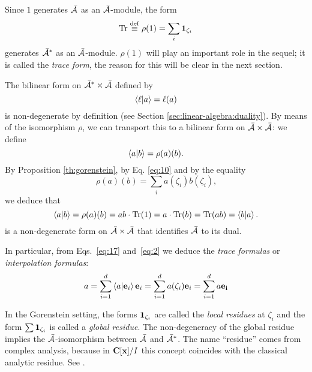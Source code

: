 Since $1$ generates $\bar{\mathcal{A}}$ as an $\bar{\mathcal{A}}$-module, the form
\begin{equation}
  \label{eq:7}
  \operatorname{Tr} \overset{\mathrm{def}}{\equiv} \rho(1) = \sum_i\mathbf{1}_{\zeta_i}
\end{equation}
generates $\bar{\mathcal{A}}^\ast$ as an $\bar{\mathcal{A}}$-module.
$\rho(1)$ will play an important role in the sequel; it is called the
\emph{trace form}, the reason for this will be clear in the next
section.

The bilinear form on $\bar{\mathcal{A}}^\ast\times\bar{\mathcal{A}}$
defined by
\begin{equation}
  \label{eq:11}
  \left\langle \ell \middle| a \right\rangle = \ell(a)
\end{equation}
is non-degenerate by definition (see Section
\ref{sec:linear-algebra:duality}). By means of the isomorphism $\rho$,
we can transport this to a bilinear form on
$\bar{\mathcal{A}}\times\bar{\mathcal{A}}$: we define
\begin{equation}
  \label{eq:15}
  \left\langle a \middle| b \right\rangle=\rho(a)(b)
  \text{.}
\end{equation}
By Proposition \ref{th:gorenstein}, by Eq. \eqref{eq:10} and by the
equality
\begin{equation}
  \label{eq:16}
  \rho(a)(b) = \sum_i a(\zeta_i)b(\zeta_i)
  \text{,}
\end{equation}
we deduce that
\begin{equation}
  \label{eq:17}
  \left\langle a \middle| b \right\rangle = \rho(a)(b) = ab\cdot\operatorname{Tr}(1) = a\cdot\operatorname{Tr}(b) = \operatorname{Tr}(ab) = \left\langle b \middle| a \right\rangle
  \text{.}
\end{equation}
is a non-degenerate form on $\bar{\mathcal{A}}\times\bar{\mathcal{A}}$
that identifies $\bar{\mathcal{A}}$ to its dual.

In particular, from Eqs.~\eqref{eq:17} and~\eqref{eq:2} we deduce the
\emph{trace formulas} or \emph{interpolation formulas}:
\begin{equation}
  \label{eq:21}
  a = \sum_{i=1}^d\left\langle a \middle| \mathbf{e}_i \right\rangle\mathbf{e}_i=\sum_{i=1}^da(\zeta_i)\mathbf{e}_i=\sum_{i=1}^da\mathbf{e_i}
\end{equation}

\begin{nota}
  In the Gorenstein setting, the forms $\mathbf{1}_{\zeta_i}$ are
  called the \emph{local residues} at $\zeta_i$ and the form
  $\sum\mathbf{1}_{\zeta_i}$ is called a \emph{global residue}. The
  non-degeneracy of the global residue implies the
  $\bar{\mathcal{A}}$-isomorphism between $\bar{\mathcal{A}}$ and
  $\bar{\mathcal{A}}^\ast$.  The name ``residue'' comes from complex
  analysis, because in $\mathbf{C}[\mathbf{x}]/I$ this concept coincides with the
  classical analytic residue. See
  \cite{bykov+kytmanov+lazman,mourrain+elkadi}.
\end{nota}


